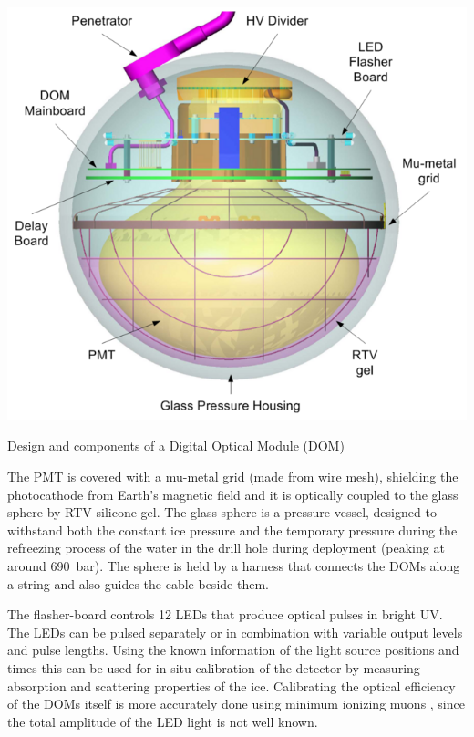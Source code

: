 \begin{marginfigure}
    \includegraphics{figures/icecube_deepcore/DOM_schematic.png}
	\caption[Digital Optical Module (DOM)]{Design and components of a Digital Optical Module (DOM) \cite{ABBASI2009294_data_acquisition}}
\end{marginfigure}

The PMT is covered with a mu-metal grid (made from wire mesh), shielding the photocathode from Earth's magnetic field and it is optically coupled to the glass sphere by RTV silicone gel. The glass sphere is a pressure vessel, designed to withstand both the constant ice pressure and the temporary pressure during the refreezing process of the water in the drill hole during deployment (peaking at around \SI{690}{\bar}). The sphere is held by a harness that connects the DOMs along a string and also guides the cable beside them.

The flasher-board controls 12 LEDs that produce optical pulses in bright UV. The LEDs can be pulsed separately or in combination with variable output levels and pulse lengths. Using the known information of the light source positions and times this can be used for in-situ calibration of the detector by measuring absorption and scattering properties of the ice. Calibrating the optical efficiency of the DOMs itself is more accurately done using minimum ionizing muons , since the total amplitude of the LED light is not well known.


